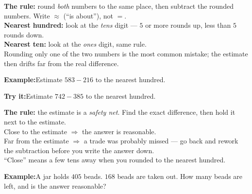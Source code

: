 \documentclass[12pt]{article}
\begin{document}


\begin{formulabox}
\textbf{The rule:} round \emph{both} numbers to the same place, then subtract the
rounded numbers. Write $\approx$ (``is about''), not $=$.\\[3pt]
\textbf{Nearest hundred:} look at the \emph{tens} digit --- $5$ or more rounds up,
less than $5$ rounds down.\\[2pt]
\textbf{Nearest ten:} look at the \emph{ones} digit, same rule.\\[3pt]
Rounding only one of the two numbers is the most common mistake; the estimate
then drifts far from the real difference.
\end{formulabox}

\begin{examplebox}
\textbf{Example:}\quad Estimate $583 - 216$ to the nearest hundred.
\end{examplebox}

\begin{tryitbox}
\textbf{Try it:}\quad Estimate $742 - 385$ to the nearest hundred.\\[2pt]
\end{tryitbox}


\begin{formulabox}
\textbf{The rule:} the estimate is a \emph{safety net}. Find the exact
difference, then hold it next to the estimate.\\[3pt]
Close to the estimate $\Rightarrow$ the answer is reasonable.\\[2pt]
Far from the estimate $\Rightarrow$ a trade was probably missed --- go back and
rework the subtraction before you write the answer down.\\[3pt]
``Close'' means a few tens away when you rounded to the nearest hundred.
\end{formulabox}

\begin{examplebox}
\textbf{Example:}\quad A jar holds $405$ beads. $168$ beads are taken out. How
many beads are left, and is the answer reasonable?
\end{examplebox}
\end{document}
